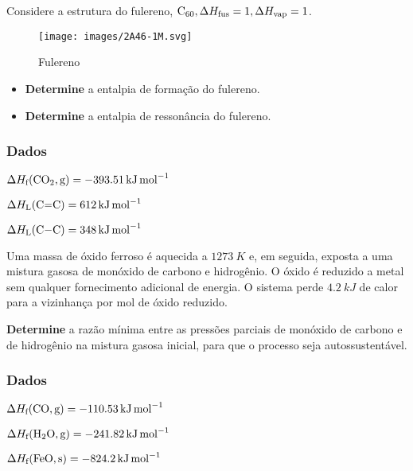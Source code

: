 \documentclass[braun, twocolumn]{braun}
\begin{document}
\begin{problem}
[2A46]Considere a estrutura do fulereno,
\(\ce{C60}, \Delta H_\text{fus} = \num{1}, \Delta H_\text{vap} = \num{1}\).

\begin{figure}
\centering
\texttt{[image: images/2A46-1M.svg]}
\caption{Fulereno}
\end{figure}

\begin{itemize}

\item
  \textbf{Determine} a entalpia de formação do fulereno.
\item
  \textbf{Determine} a entalpia de ressonância do fulereno.
\end{itemize}
\subsubsection*{Dados}


\begin{datalist}

\item $\Delta H_\text{f}(\ce{CO2, {g}}) = \qty{-393,51}{kJ.mol^{-1}}$
\item $\Delta H_\text{L}(\ce{C=C}) = \qty{612}{kJ.mol^{-1}}$
\item $\Delta H_\text{L}(\ce{C-C}) = \qty{348}{kJ.mol^{-1}}$
\end{datalist}

\end{problem}



\begin{problem}
[2A47]Uma massa de óxido ferroso é aquecida a \(\qty{1273}{K}\) e, em seguida,
exposta a uma mistura gasosa de monóxido de carbono e hidrogênio. O
óxido é reduzido a metal sem qualquer fornecimento adicional de energia.
O sistema perde \(\qty{4,2}{kJ}\) de calor para a vizinhança por mol de
óxido reduzido.

\textbf{Determine} a razão mínima entre as pressões parciais de monóxido
de carbono e de hidrogênio na mistura gasosa inicial, para que o
processo seja autossustentável.
\subsubsection*{Dados}


\begin{datalist}

\item $\Delta H_\text{f}(\ce{CO, {g}}) = \qty{-110,53}{kJ.mol^{-1}}$
\item $\Delta H_\text{f}(\ce{H2O, {g}}) = \qty{-241,82}{kJ.mol^{-1}}$
\item $\Delta H_\text{f}(\ce{FeO, {s}}) = \qty{-824,2}{kJ.mol^{-1}}$
\end{datalist}

\end{problem}
\end{document}
